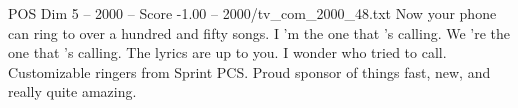 \begin{textsample}{POS Dim 5 – 2000 – Score -1.00 – 2000/tv\_com\_2000\_48.txt}  \label{ex:f5_pos_069}
Now your phone can ring to over a hundred and fifty songs.
I 'm the one that 's calling.
We 're the one that 's calling.
The lyrics are up to you.
I wonder who tried to call.
Customizable ringers from Sprint PCS.
Proud sponsor of things fast, new, and really quite amazing.

\end{textsample}
